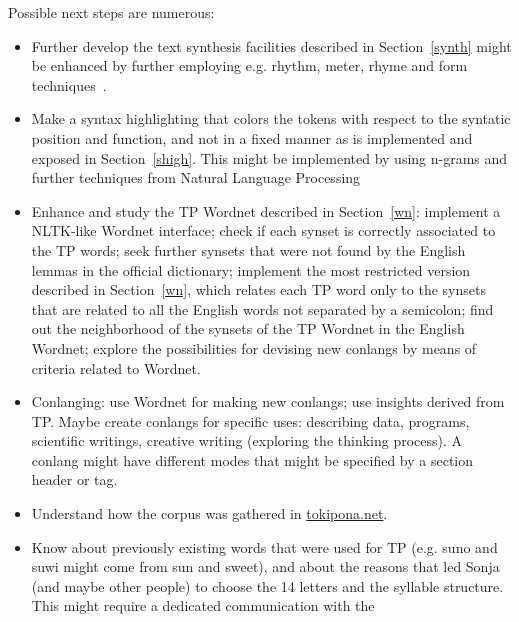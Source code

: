 \documentclass{article}
\begin{document}
Possible next steps are numerous:
\begin{itemize}
  \item Further develop the text synthesis facilities described in
    Section~\ref{synth} might be enhanced by further employing e.g.
    rhythm, meter, rhyme and form techniques~\cite{wikiPoetry}.
  \item Make a syntax highlighting that colors the tokens with respect
    to the syntatic position and function, and not in a fixed manner
    as is implemented and exposed in Section~\ref{shigh}.
    This might be implemented by using n-grams and
    further techniques from Natural Language Processing
  \item Enhance and study the TP Wordnet described in Section~\ref{wn}:
    implement a NLTK-like Wordnet interface; check if each synset
    is correctly associated to the TP words; seek further synsets
    that were not found by the English lemmas in the official
    dictionary; implement the most restricted version described in
    Section~\ref{wn}, which relates each TP word only to the synsets
    that are related to all the English words not separated by a
    semicolon; find out the neighborhood of the synsets of the TP
    Wordnet in the English Wordnet; explore the possibilities for
    devising new conlangs by means of criteria related to Wordnet.
  \item Conlanging: use Wordnet for making new conlangs;
    use insights derived from TP.
    Maybe create conlangs for specific uses:
    describing data, programs,
    scientific writings, creative writing
    (exploring the thinking process).
    A conlang might have different modes that might 
    be specified by a section header or tag. 
  \item Understand how the corpus was gathered in \url{tokipona.net}.
  \item Know about previously existing words that were used for TP
    (e.g. suno and suwi might come from sun and sweet),
    and about the reasons that led Sonja (and maybe other people)
    to choose the 14 letters and the syllable structure.
    This might require a dedicated communication with the

\end{itemize}
\end{document}
